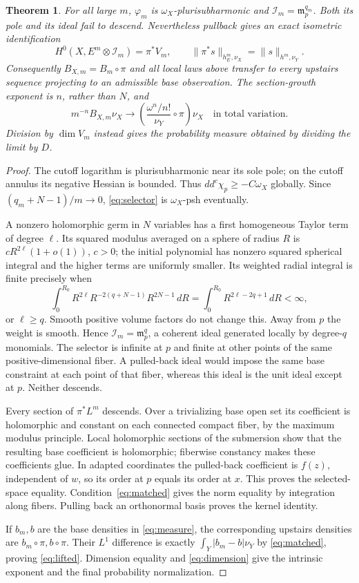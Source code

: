 \documentclass[11pt]{article}
\newtheorem{theorem}{Theorem}
\theoremstyle{remark}\newtheorem{remark}[theorem]{Remark}
\newcommand{\ddc}{dd^c}
\newcommand{\II}{\mathcal I}
\newcommand{\mm}{\mathfrak m}
\begin{document}
\begin{theorem}\label{thm:fibration}
For all large $m$, $\varphi_m$ is $\omega_X$-plurisubharmonic and
$\II_m=\mm_p^{q_m}$. Both its pole and its ideal fail to descend.
Nevertheless pullback gives an exact isometric identification
\[
 H^0(X,E^m\otimes\II_m)=\pi^*V_m,
 \qquad \|\pi^*s\|_{h_E^m,\nu_X}=\|s\|_{h^m,\nu_Y}.
\]
Consequently $B_{X,m}=B_m\circ\pi$ and all local laws above transfer
to every upstairs sequence projecting to an admissible base observation.
The section-growth exponent is $n$, rather than $N$, and
\begin{equation}\label{eq:lifted}
 m^{-n}B_{X,m}\nu_X\longrightarrow
 \left(\frac{\omega^n/n!}{\nu_Y}\circ\pi\right)\nu_X
 \quad\text{in total variation}.
\end{equation}
Division by $\dim V_m$ instead gives the probability measure obtained
by dividing the limit by $D$.
\end{theorem}

\begin{proof}
The cutoff logarithm is plurisubharmonic near its sole pole; on the
cutoff annulus its negative Hessian is bounded. Thus
$\ddc\chi_p\geq-C\omega_X$ globally. Since
$(q_m+N-1)/m\to0$, \eqref{eq:selector} is $\omega_X$-psh eventually.

A nonzero holomorphic germ in $N$ variables has a first homogeneous
Taylor term of degree $\ell$. Its squared modulus averaged on a sphere
of radius $R$ is $cR^{2\ell}(1+o(1))$, $c>0$; the initial polynomial
has nonzero squared spherical integral and the higher terms are uniformly
smaller. Its weighted radial integral is finite precisely when
\[
 \int_0^{R_0}R^{2\ell}R^{-2(q+N-1)}R^{2N-1}\,dR
 =\int_0^{R_0}R^{2\ell-2q+1}\,dR<\infty,
\]
or $\ell\geq q$. Smooth positive volume factors do not change this.
Away from $p$ the weight is smooth. Hence $\II_m=\mm_p^q$, a
coherent ideal generated locally by degree-$q$ monomials.
The selector is infinite at $p$ and finite at other points of the same
positive-dimensional fiber. A pulled-back ideal would impose the same
base constraint at each point of that fiber, whereas this ideal is the
unit ideal except at $p$. Neither descends.

Every section of $\pi^*L^m$ descends. Over a trivializing base open
set its coefficient is holomorphic and constant on each connected compact
fiber, by the maximum modulus principle. Local holomorphic sections of
the submersion show that the resulting base coefficient is holomorphic;
fiberwise constancy makes these coefficients glue. In adapted coordinates
the pulled-back coefficient is $f(z)$, independent of $w$, so its order
at $p$ equals its order at $x$. This proves the selected-space equality.
Condition~\eqref{eq:matched} gives the norm equality by integration
along fibers. Pulling back an orthonormal basis proves the kernel identity.

If $b_m,b$ are the base densities in \eqref{eq:measure}, the corresponding
upstairs densities are $b_m\circ\pi,b\circ\pi$. Their $L^1$ difference
is exactly $\int_Y|b_m-b|\nu_Y$ by \eqref{eq:matched}, proving
\eqref{eq:lifted}. Dimension equality and \eqref{eq:dimension} give
the intrinsic exponent and the final probability normalization.
\end{proof}
\end{document}
